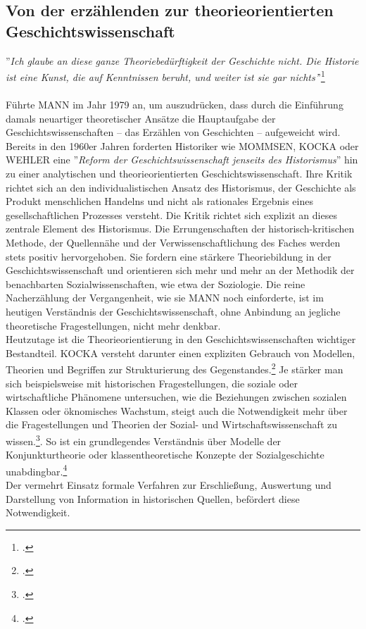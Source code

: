 \documentclass[12pt,a4paper]{article}
\begin{document}
\subsection{Von der erzählenden zur theorieorientierten Geschichtswissenschaft}

''\textit{Ich glaube an diese ganze Theoriebedürftigkeit der Geschichte nicht. Die Historie ist eine Kunst, die auf Kenntnissen beruht, und weiter ist sie gar nichts'}'\footcite[Vgl.][S.53]{mann1979pladoyer}
\\
\\
Führte MANN im Jahr 1979 an, um auszudrücken, dass durch die Einführung damals neuartiger theoretischer Ansätze die Hauptaufgabe der Geschichtswissenschaften --  das Erzählen von Geschichten -- aufgeweicht wird. Bereits in den 1960er Jahren forderten Historiker wie MOMMSEN, KOCKA oder WEHLER eine ''\textit{Reform der Geschichtswissenschaft jenseits des Historismus}'' hin zu einer analytischen und theorieorientierten Geschichtswissenschaft. Ihre Kritik richtet sich an den individualistischen Ansatz des Historismus, der Geschichte als Produkt menschlichen Handelns und nicht als rationales Ergebnis eines gesellschaftlichen Prozesses versteht. Die Kritik richtet sich explizit an dieses zentrale Element des Historismus. Die Errungenschaften der historisch-kritischen Methode, der Quellennähe und der Verwissenschaftlichung des Faches werden stets positiv hervorgehoben. Sie fordern eine stärkere Theoriebildung in der Geschichtswissenschaft und orientieren sich mehr und mehr an der Methodik der benachbarten Sozialwissenschaften, wie etwa der Soziologie. Die reine Nacherzählung der Vergangenheit, wie sie MANN noch einforderte, ist im heutigen Verständnis der Geschichtswissenschaft, ohne Anbindung an jegliche theoretische Fragestellungen, nicht mehr denkbar.
\\
Heutzutage ist die Theorieorientierung in den Geschichtswissenschaften wichtiger Bestandteil. KOCKA versteht darunter einen expliziten Gebrauch von Modellen, Theorien und Begriffen zur Strukturierung des Gegenstandes.\footcite[][S.2]{magerski2009schreibt} Je stärker man sich beispielsweise mit historischen Fragestellungen, die soziale oder wirtschaftliche Phänomene untersuchen, wie die Beziehungen zwischen sozialen Klassen oder öknomisches Wachstum, steigt auch die Notwendigkeit mehr über die Fragestellungen und Theorien der Sozial- und Wirtschaftswissenschaft zu wissen.\footcite[][S.6-8]{kocka1982theorien}. So ist ein grundlegendes Verständnis über Modelle der Konjunkturtheorie oder klassentheoretische Konzepte der Sozialgeschichte unabdingbar.\footcite[][S.1]{sokollgrundlagen}
\\
Der vermehrt Einsatz formale Verfahren zur Erschließung, Auswertung und Darstellung von Information in historischen Quellen, befördert diese Notwendigkeit.
\end{document}
